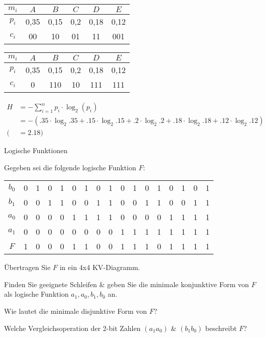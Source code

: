 \documentclass{exercisesheet}
\begin{document}
\begin{solution**}
  \item
  \begin{tabular}{c|ccccc}
    $m_i$ & $A$  & $B$  & $C$ & $D$  & $E$  \\
    \hline
    $p_i$ & 0,35 & 0,15 & 0,2 & 0,18 & 0,12 \\
    $c_i$ & 00   & 10   & 01  & 11   & 001  \\
  \end{tabular}
  \item
  \begin{tabular}{c|ccccc}
    $m_i$ & $A$  & $B$  & $C$ & $D$  & $E$  \\
    \hline
    $p_i$ & 0,35 & 0,15 & 0,2 & 0,18 & 0,12 \\
    $c_i$ & 0    & 110  & 10  & 111  & 111  \\
  \end{tabular}
  \item
  \begin{equation*}
    \begin{split}
      H & = -\sum_{i=1}^{n} p_i \cdot \log_2(p_i)                                                                         \\
        & = -(.35\cdot \log_2{.35}+ .15\cdot \log_2{.15}+ .2\cdot \log_2{.2}+ .18\cdot \log_2{.18}+ .12\cdot \log_2{.12}) \\
      ( & =2.18)
    \end{split}
  \end{equation*}
\end{solution**}

\begin{exercise*}{Logische Funktionen}{
    Gegeben sei die folgende logische Funktion $F$:
    \centering\begin{tabular}{c|cccc cccc cccc cccc}
      $b_0$ & 0 & 1 & 0 & 1 & 0 & 1 & 0 & 1 & 0 & 1 & 0 & 1 & 0 & 1 & 0 & 1 \\
      $b_1$ & 0 & 0 & 1 & 1 & 0 & 0 & 1 & 1 & 0 & 0 & 1 & 1 & 0 & 0 & 1 & 1 \\
      $a_0$ & 0 & 0 & 0 & 0 & 1 & 1 & 1 & 1 & 0 & 0 & 0 & 0 & 1 & 1 & 1 & 1 \\
      $a_1$ & 0 & 0 & 0 & 0 & 0 & 0 & 0 & 0 & 1 & 1 & 1 & 1 & 1 & 1 & 1 & 1 \\
      \hline
      $F$   & 1 & 0 & 0 & 0 & 1 & 1 & 0 & 0 & 1 & 1 & 1 & 0 & 1 & 1 & 1 & 1 \\
    \end{tabular}
  }
  \item Übertragen Sie $F$ in ein 4x4 KV-Diagramm.
  \item Finden Sie geeignete Schleifen \& geben Sie die minimale konjunktive Form von $F$ als logische Funktion $a_1, a_0, b_1, b_0$ an.
  \item Wie lautet die minimale disjunktive Form von $F$?
  \item Welche Vergleichsoperation der 2-bit Zahlen $(a_1a_0)$ \& $(b_1b_0)$ beschreibt $F$?
\end{exercise*}
\end{document}
